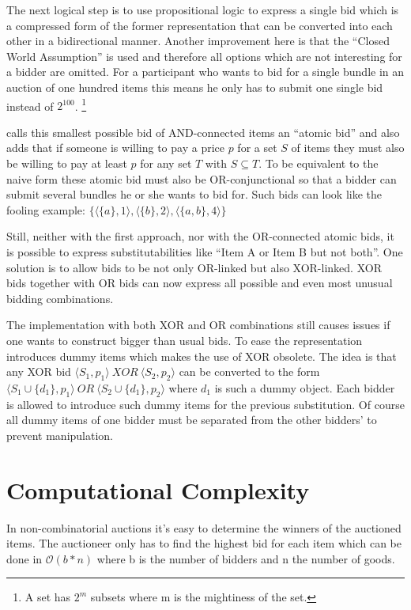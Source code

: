 \documentclass[a4paper]{paper}
\begin{document}
The next logical step is to use propositional logic to express a single bid which is a compressed form of the former representation that can be converted into each other in a bidirectional manner. Another improvement here is that the ``Closed World Assumption'' is used and therefore all options which are not interesting for a bidder are omitted. For a participant who wants to bid for a single bundle in an auction of one hundred items this means he only has to submit one single bid instead of $2^{100}$. \footnote{A set has $2^m$ subsets where m is the mightiness of the set.}

\cite{Nis00} calls this smallest possible bid of AND-connected items an ``atomic bid'' and also adds that if someone is willing to pay a price $p$ for a set $S$ of items they must also be willing to pay at least $p$ for any set $T$ with $S \subseteq T$. To be equivalent to the naive form these atomic bid must also be OR-conjunctional so that a bidder can submit several bundles he or she wants to bid for. Such bids can look like the fooling example: $\{ \langle \{a\}, 1 \rangle, \langle \{b\}, 2 \rangle, \langle \{a,b\},4 \rangle \}$

Still, neither with the first approach, nor with the OR-connected atomic bids, it is possible to express substitutabilities like ``Item A or Item B but not both''. One solution is to allow bids to be not only OR-linked but also XOR-linked. XOR bids together with OR bids can now express all possible and even most unusual bidding combinations.

The implementation with both XOR and OR combinations still causes issues if one wants to construct bigger than usual bids. To ease the representation \cite{FLBS99} introduces dummy items which makes the use of XOR obsolete. The idea is that any XOR bid $\langle S_1, p_1 \rangle \ XOR \ \langle S_2, p_2 \rangle $ can be converted to the form $\langle S_1 \cup \{d_1\}, p_1 \rangle \ OR \ \langle S_2 \cup \{d_1\}, p_2 \rangle $ where $d_1$ is such a dummy object. Each bidder is allowed to introduce such dummy items for the previous substitution. Of course all dummy items of one bidder must be separated from the other bidders' to prevent manipulation.

\section{Computational Complexity}

In non-combinatorial auctions it's easy to determine the winners of the auctioned items. The auctioneer only has to find the highest bid for each item which can be done in $\mathcal O(b * n)$ where b is the number of bidders and n the number of goods.
\end{document}
